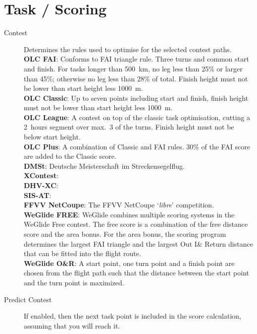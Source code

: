 \section{Task / Scoring}

\begin{description}
\item[Contest]  Determines the rules used to optimise for the selected contest 
  paths. \\
  {\bf OLC FAI}: Conforms to FAI triangle rule. Three turns and common start and 
  finish.  For tasks longer than
  500~km, no leg less than 25\% or larger than 45\%; otherwise no leg less than 28\%
  of total.  Finish height must not be lower than start height less 1000~m. \\
  {\bf OLC Classic}: Up to seven points including start and finish, finish height
  must not be lower than start height less 1000~m. \\
  {\bf OLC League}: A contest on top of the classic task optimisation, cutting
  a 2~hours segment over max.\ 3 of the turns. Finish height must not be below
  start height. \\
  {\bf OLC Plus}: A combination of Classic and FAI rules. 30\% of the FAI score
  are added to the Classic score. \\
  {\bf DMSt}: Deutsche Meisterschaft im Streckensegelflug. \\
  {\bf XContest}:  \\
  {\bf DHV-XC}:  \\
  {\bf SIS-AT}:  \\
  {\bf FFVV NetCoupe}: The FFVV NetCoupe `{\it libre}' competition. \\
  {\bf WeGlide FREE}: WeGlide combines multiple scoring systems in the WeGlide Free contest. The free score is a combination of the free distance score and the area bonus. For the area bonus, the scoring program determines the largest FAI triangle and the largest Out I\& Return distance that can be fitted into the flight route. \\
  {\bf WeGlide O\&R}: A start point, one turn point and a finish point are chosen from the flight path such that the distance between the start point and the turn point is maximized. \\
\item[Predict Contest]  If enabled, then the next task point is included in the 
  score calculation, assuming that you will reach it.
\end{description}



